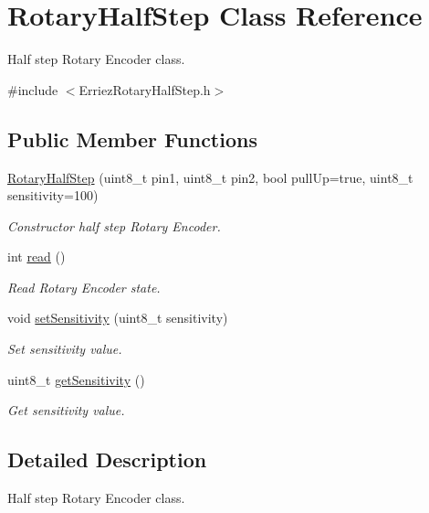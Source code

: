 \hypertarget{class_rotary_half_step}{}\section{Rotary\+Half\+Step Class Reference}
\label{class_rotary_half_step}


Half step Rotary Encoder class.  




{\ttfamily \#include $<$Erriez\+Rotary\+Half\+Step.\+h$>$}

\subsection*{Public Member Functions}
\begin{DoxyCompactItemize}
\item 
\hyperlink{class_rotary_half_step_acef309ba254f737c5e757f77a4a3d86f}{Rotary\+Half\+Step} (uint8\+\_\+t pin1, uint8\+\_\+t pin2, bool pull\+Up=true, uint8\+\_\+t sensitivity=100)
\begin{DoxyCompactList}\small\item\em Constructor half step Rotary Encoder. \end{DoxyCompactList}\item 
int \hyperlink{class_rotary_half_step_ad32ff93a4ee0aaea284b96209eaac485}{read} ()
\begin{DoxyCompactList}\small\item\em Read Rotary Encoder state. \end{DoxyCompactList}\item 
void \hyperlink{class_rotary_half_step_a9189f6298bd4df310db6859fdcf3041e}{set\+Sensitivity} (uint8\+\_\+t sensitivity)
\begin{DoxyCompactList}\small\item\em Set sensitivity value. \end{DoxyCompactList}\item 
uint8\+\_\+t \hyperlink{class_rotary_half_step_a989c6e9bb27d656c97814ff3e542ba12}{get\+Sensitivity} ()
\begin{DoxyCompactList}\small\item\em Get sensitivity value. \end{DoxyCompactList}\end{DoxyCompactItemize}


\subsection{Detailed Description}
Half step Rotary Encoder class. 

